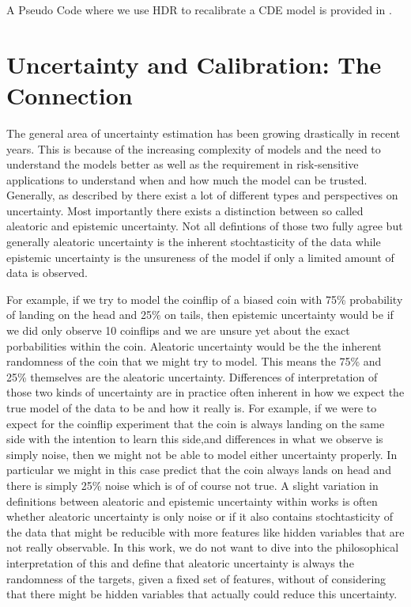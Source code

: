 A Pseudo Code where we use HDR to recalibrate a CDE model is provided in .

\section{Uncertainty and Calibration: The Connection}\label{sec:uncertainty_calibration}

The general area of uncertainty estimation has been growing drastically in recent years. This is because of the increasing complexity of models and the need to understand the models better as well as the requirement in risk-sensitive applications to understand when and how much the model can be trusted. Generally, as described by \cite{hullermeier_aleatoric_2021} there exist a lot of different types and perspectives on uncertainty. Most importantly there exists a distinction between so called aleatoric and epistemic uncertainty. Not all defintions of those two fully agree but generally aleatoric uncertainty is the inherent stochtasticity of the data while epistemic uncertainty is the unsureness of the model if only a limited amount of data is observed.

For example, if we try to model the coinflip of a biased coin with 75\% probability of landing on the head and 25\% on tails, then epistemic uncertainty would be if we did only observe 10 coinflips and we are unsure yet about the exact porbabilities within the coin. Aleatoric uncertainty would be the the inherent randomness of the coin that we might try to model. This means the 75\% and 25\% themselves are the aleatoric uncertainty.
Differences of interpretation of those two kinds of uncertainty are in practice often inherent in how we expect the true model of the data to be and how it really is. For example, if we were to expect for the coinflip experiment that the coin is always landing on the same side with the intention to learn this side,and differences in what we observe is simply noise, then we might not be able to model either uncertainty properly. In particular we might in this case predict that the coin always lands on head and there is simply 25\% noise which is of of course not true.
A slight variation in definitions between aleatoric and epistemic uncertainty within works \cite{hullermeier_aleatoric_2021} is often whether aleatoric uncertainty is only noise or if it also contains stochtasticity of the data that might be reducible with more features like hidden variables that are not really observable. In this work, we do not want to dive into the philosophical interpretation of this and define that aleatoric uncertainty is always the randomness of the targets, given a fixed set of features, without of considering that there might be hidden variables that actually could reduce this uncertainty.

